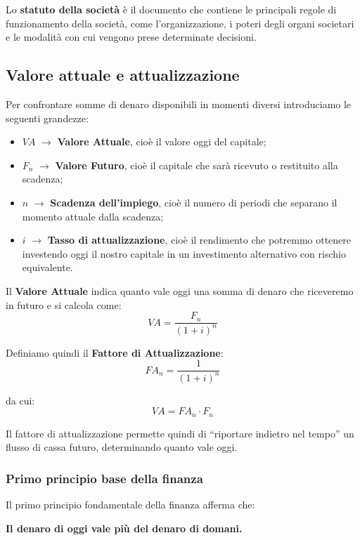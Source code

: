\noindent Lo \textbf{statuto della società} è il documento che contiene le principali regole di funzionamento della società, come 
l'organizzazione, i poteri degli organi societari e le modalità con cui vengono prese determinate decisioni.

\subsection{Valore attuale e attualizzazione}

Per confrontare somme di denaro disponibili in momenti diversi introduciamo le seguenti grandezze:
\begin{itemize}
    \item \(VA\) $\rightarrow$ \textbf{Valore Attuale}, cioè il valore oggi del capitale;
    \item \(F_n\) $\rightarrow$ \textbf{Valore Futuro}, cioè il capitale che sarà ricevuto o restituito alla scadenza;
    \item \(n\) $\rightarrow$ \textbf{Scadenza dell'impiego}, cioè il numero di periodi che separano il momento attuale dalla scadenza;
    \item \(i\) $\rightarrow$ \textbf{Tasso di attualizzazione}, cioè il rendimento che potremmo ottenere investendo oggi il nostro capitale in un investimento alternativo con rischio equivalente.
\end{itemize}

\noindent Il \textbf{Valore Attuale} indica quanto vale oggi una somma di denaro che riceveremo in futuro e si calcola come:
\[
VA = \frac{F_n}{(1+i)^n}
\]

\noindent Definiamo quindi il \textbf{Fattore di Attualizzazione}:
\[
FA_n = \frac{1}{(1+i)^n}
\]

\noindent da cui:
\[
VA = FA_n \cdot F_n
\]

\noindent Il fattore di attualizzazione permette quindi di ``riportare indietro nel tempo'' un flusso di cassa futuro, determinando quanto vale oggi.

\subsubsection*{Primo principio base della finanza}
Il primo principio fondamentale della finanza afferma che:

\begin{center}
    \textbf{Il denaro di oggi vale più del denaro di domani.}
\end{center}

